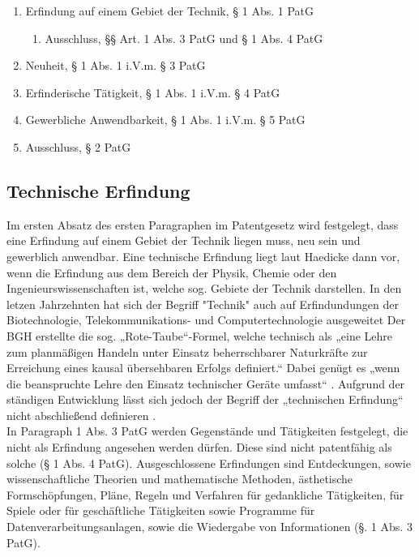 \begin{enumerate}
    \item Erfindung auf einem Gebiet der Technik, § 1 Abs. 1 PatG
    \begin{enumerate}
    \vspace{-0.05in}
    \item Ausschluss, §§ Art. 1 Abs. 3 PatG und § 1 Abs. 4 PatG
    \end{enumerate}
    \vspace{-0.11in} 
    \item Neuheit, § 1 Abs. 1 i.V.m. § 3 PatG
    \vspace{-0.11in} 
    \item Erfinderische Tätigkeit, § 1 Abs. 1 i.V.m. § 4 PatG
    \vspace{-0.11in} 
    \item Gewerbliche Anwendbarkeit, § 1 Abs. 1 i.V.m. § 5 PatG
    \vspace{-0.11in} 
    \item Ausschluss, § 2 PatG
\end{enumerate}

\subsection{Technische Erfindung}

Im ersten Absatz des ersten Paragraphen im Patentgesetz wird festgelegt,
dass eine Erfindung auf einem Gebiet der Technik liegen muss, neu sein und
gewerblich anwendbar.
Eine technische Erfindung liegt laut Haedicke dann vor, 
wenn die Erfindung aus dem Bereich der Physik, 
Chemie oder den Ingenieurswissenschaften ist, 
welche sog. Gebiete der Technik darstellen.
In den letzen Jahrzehnten hat sich der Begriff 
"Technik" auch auf Erfindundungen der Biotechnologie, 
Telekommunikations- und Computertechnologie ausgeweitet 
\cite{haedickeEinfuhrung2020}
Der \gls{BGH} erstellte die
sog. „Rote-Taube“-Formel, welche technisch als  
„eine Lehre zum planmäßigen Handeln 
unter Einsatz beherrschbarer Naturkräfte zur Erreichung eines 
kausal übersehbaren Erfolgs definiert.“\cite{BGH27031969}  
Dabei genügt es „wenn die beanspruchte Lehre den Einsatz technischer Geräte umfasst“
\cite{BGH3020152015}\cite{BGH2420112011a}. 
Aufgrund der ständigen Entwicklung lässt sich 
jedoch der Begriff der „technischen Erfindung“ 
nicht abschließend definieren \cite{haedickeEinfuhrung2020}.
\\
In Paragraph 1 Abs. 3 PatG werden Gegenstände und Tätigkeiten festgelegt, 
die nicht als Erfindung angesehen werden dürfen. 
Diese sind nicht patentfähig als solche (§ 1 Abs. 4 PatG). 
Ausgeschlossene Erfindungen sind Entdeckungen, 
sowie wissenschaftliche Theorien und mathematische Methoden, 
ästhetische Formschöpfungen, Pläne, Regeln und Verfahren für gedankliche Tätigkeiten, 
für Spiele 
oder für geschäftliche Tätigkeiten sowie Programme für Datenverarbeitungsanlagen, 
sowie die Wiedergabe von Informationen (§. 1 Abs. 3 PatG). 
\\

